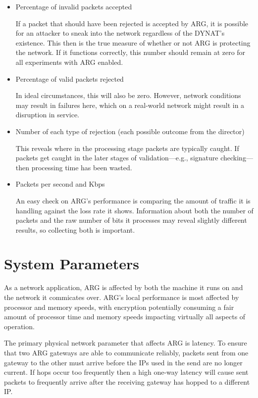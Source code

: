\begin{itemize}
\item Percentage of invalid packets accepted
	\par If a packet that should have been rejected is accepted by \ac{ARG}, it is possible for an attacker to sneak into the network regardless of the \ac{DYNAT}'s existence. This then is the true measure of whether or not \ac{ARG} is protecting the network. If it functions correctly, this number should remain at zero for all experiments with \ac{ARG} enabled.

\item Percentage of valid packets rejected
	\par In ideal circumstances, this will also be zero. However, network conditions may result in failures here, which on a real-world network might result in a disruption in service. 

\item Number of each type of rejection (each possible outcome from the director)
	\par This reveals where in the processing stage packets are typically caught. If packets get caught in the later stages of validation---e.g., signature checking---then processing time has been wasted.

\item Packets per second and \acf{Kbps}
	\par An easy check on \ac{ARG}'s performance is comparing the amount of traffic it is handling against the loss rate it shows. Information about both the number of packets and the raw number of bits it processes may reveal slightly different results, so collecting both is important.
\end{itemize}

\section{System Parameters}
\label{sec:parameters}
\par As a network application, \ac{ARG} is affected by both the machine it runs on and the network it commicates over. \ac{ARG}'s local performance is most affected by processor and memory speeds, with encryption potentially consuming a fair amount of processor time and memory speeds impacting virtually all aspects of operation.

\par The primary physical network parameter that affects \ac{ARG} is latency. To ensure that two \ac{ARG} gateways are able to communicate reliably, packets sent from one gateway to the other must arrive before the \acp{IP} used in the send are no longer current. If hops occur too frequently then a high one-way latency will cause sent packets to frequently arrive after the receiving gateway has hopped to a different \ac{IP}. 

